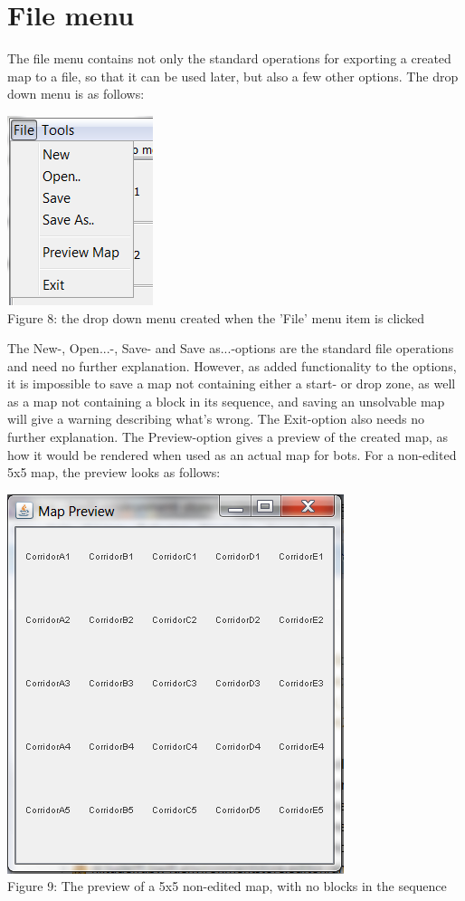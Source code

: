 \documentclass[]{article}
\begin{document}
\section*{File menu}
The file menu contains not only the standard operations for exporting a created map to a file, so that it can be used later, but also a few other options. The drop down menu is as follows:
\begin{center}
	\centering
	\includegraphics{DropDownFile.png}\\
	Figure 8: the drop down menu created when the 'File' menu item is clicked
\end{center}
The New-, Open...-, Save- and Save as...-options are the standard file operations and need no further explanation. However, as added functionality to the options, it is impossible to save a map not containing either a start- or drop zone, as well as a map not containing a block in its sequence, and saving an unsolvable map will give a warning describing what's wrong. The Exit-option also needs no further explanation. The Preview-option gives a preview of the created map, as how it would be rendered when used as an actual map for bots. For a non-edited 5x5 map, the preview looks as follows:
\begin{center}
	\centering
	\includegraphics{Preview.png}\\
	Figure 9: The preview of a 5x5 non-edited map, with no blocks in the sequence
\end{center}
\end{document}
